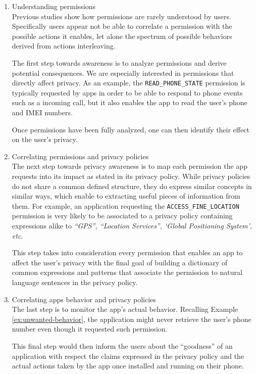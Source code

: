 \documentclass[twoside,letterpaper]{soups}
\theoremstyle{definition}
\begin{document}
\begin{enumerate}
       \item Understanding permissions \hfill \\
              Previous studies \cite{Felt:2012:APU:2335356.2335360} show how permissions are rarely understood by users. Specifically users appear not be able to correlate a permission with the possible actions it enables, let alone the spectrum of possible behaviors derived from actions interleaving.

              The first step towards awareness is to analyze permissions and derive potential consequences. We are especially interested in permissions that directly affect privacy. As an example, the \texttt{READ\_PHONE\_STATE} permission is typically requested by apps in order to be able to respond to phone events such as a incoming call, but it also enables the app to read the user's phone and IMEI numbers.

              Once permissions have been fully analyzed, one can then identify their  effect on the user's privacy.

       \item Correlating permissions and privacy policies \hfill \\
              The next step towards privacy awareness is to map each permission the app requests into its impact as stated in its privacy policy.
              While privacy policies do not share a common defined structure, they do express similar concepts in similar ways, which enable to extracting useful pieces of information from them. For example, an application requesting the \texttt{ACCESS\_FINE\_LOCATION} permission is very likely to be associated to a privacy policy containing expressions alike to \emph{``GPS'', ``Location Services'', `Global Positioning System', etc}.

              This step takes into consideration every permission that enables an app to affect the user's privacy with the final goal of building a dictionary of common expressions and patterns that associate the permission to natural language sentences in the privacy policy.

       \item Correlating apps behavior and privacy policies \hfill \\
              The last step is to monitor the app's actual behavior. Recalling Example \ref{ex:unwanted-behavior}, the application might never retrieve the user's phone number even though it requested such permission.

              This final step would then inform the users about the ``goodness'' of an application with respect the claims expressed in the privacy policy and the actual actions taken by the app once installed and running on their phone.
\end{enumerate}
\end{document}
